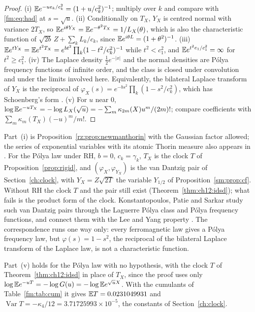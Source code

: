 \begin{proof}
(i) $\mathbb{E} e^{-ue_k/c_k^2}=(1+u/c_k^2)^{-1}$; multiply over $k$ and compare with \eqref{fm:eq:had} at $s=\sqrt u$. (ii) Conditionally on $T_X$, $Y_X$ is centred normal with variance $2T_X$, so $\mathbb{E} e^{i\theta Y_X}=\mathbb{E} e^{-\theta^2T_X}=1/L_X(\theta)$, which is also the characteristic function of $\sqrt{2b}\,Z+\sum_kL_k/c_k$, since $\mathbb{E} e^{i\theta L}=(1+\theta^2)^{-1}$. (iii) $\mathbb{E} e^{tY_X}=\mathbb{E} e^{t^2T_X}=e^{bt^2}\prod_k(1-t^2/c_k^2)^{-1}$ while $t^2<c_1^2$, and $\mathbb{E} e^{t^2e_1/c_1^2}=\infty$ for $t^2\ge c_1^2$. (iv) The Laplace density $\frac12e^{-|x|}$ and the normal densities are P\'olya frequency functions of infinite order, and the class is closed under convolution and under the limits involved here. Equivalently, the bilateral Laplace transform of $Y_X$ is the reciprocal of $\varphi_X(s)=e^{-bs^2}\prod_k(1-s^2/c_k^2)$, which has Schoenberg's form \cite{Schoenberg51}. (v) For $u$ near $0$, $\log\mathbb{E} e^{-uT_X}=-\log L_X(\sqrt u)=-\sum_m\kappa_{2m}(X)u^m/(2m)!$; compare coefficients with $\sum_m\kappa_m(T_X)(-u)^m/m!$.
\end{proof}

Part~(i) is Proposition~\ref{rz:prop:newmanthorin} with the Gaussian factor allowed; the series of exponential variables with its atomic Thorin measure also appears in \cite{P18}. For the P\'olya law under RH, $b=0$, $c_k=\gamma_k$, $T_X$ is the clock $T$ of Proposition~\ref{prop:rigid}, and $(\varphi_X,\varphi_{Y_X})$ is the van Dantzig pair of Section~\ref{ch:clock}, with $Y_X=Z\sqrt{2T}$ the variable $Y_{1/2}$ of Proposition~\ref{sm:prop:cf}. Without RH the clock $T$ and the pair still exist (Theorem~\ref{thm:ch12:idsd}); what fails is the product form of the clock. Konstantopoulos, Patie and Sarkar study such van Dantzig pairs through the Laguerre P\'olya class and P\'olya frequency functions, and connect them with the Lee and Yang property \cite{KPS24}. The correspondence runs one way only: every ferromagnetic law gives a P\'olya frequency law, but $\varphi(s)=1-s^2$, the reciprocal of the bilateral Laplace transform of the Laplace law, is not a characteristic function.

Part~(v) holds for the P\'olya law with no hypothesis, with the clock $T$ of Theorem~\ref{thm:ch12:idsd} in place of $T_X$, since the proof uses only $\log\mathbb{E} e^{-uT}=-\log G(u)=-\log\mathbb{E} e^{\sqrt uX}$. With the cumulants of Table~\ref{fm:tab:cum} it gives $\mathbb{E} T=0.0231049931$ and $\operatorname{Var}T=-\kappa_4/12=3.71725993\times10^{-5}$, the constants of Section~\ref{ch:clock}.

